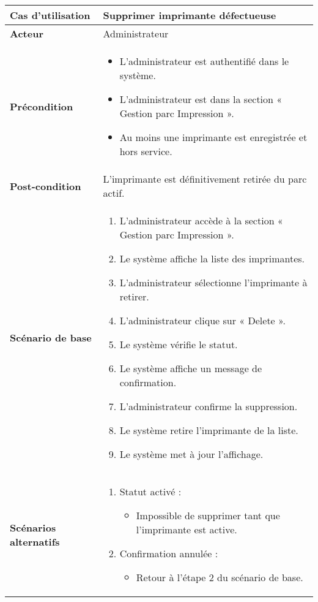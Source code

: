 \documentclass[a4paper,11pt]{report}
\begin{document}
\begin{tabularx}{\textwidth}{|>{\bfseries}l|X|}
\hline
Cas d’utilisation    & Supprimer imprimante défectueuse \\
\hline
Acteur               & Administrateur \\
\hline
Précondition         &
\begin{itemize}[left=0pt]
  \item L’administrateur est authentifié dans le système.
  \item L’administrateur est dans la section « Gestion parc Impression ».
  \item Au moins une imprimante est enregistrée et hors service.
\end{itemize} \\
\hline
Post-condition       & L’imprimante est définitivement retirée du parc actif. \\
\hline
Scénario de base     &
\begin{enumerate}[left=0pt]
  \item L’administrateur accède à la section « Gestion parc Impression ».
  \item Le système affiche la liste des imprimantes.
  \item L’administrateur sélectionne l’imprimante à retirer.
  \item L’administrateur clique sur « Delete ».
  \item Le système vérifie le statut.
  \item Le système affiche un message de confirmation.
  \item L’administrateur confirme la suppression.
  \item Le système retire l’imprimante de la liste.
  \item Le système met à jour l’affichage.
\end{enumerate} \\
\hline
Scénarios alternatifs &
\begin{enumerate}[label=\arabic*.a,wide=0pt]
  \item Statut activé :
    \begin{itemize}[left=1em]
      \item Impossible de supprimer tant que l’imprimante est active.
    \end{itemize}
  \item Confirmation annulée :
    \begin{itemize}[left=1em]
      \item Retour à l’étape 2 du scénario de base.
    \end{itemize}
\end{enumerate} \\
\hline
\end{tabularx}
\end{document}
